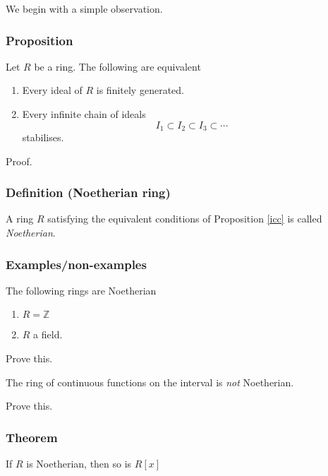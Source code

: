 \documentclass[11pt]{article}
\begin{document}
We begin with a simple observation.
\subsubsection{Proposition}
\label{sec:org4646b83}
\label{icc}
    Let \(R\) be a ring. The following are equivalent
\begin{enumerate}
\item Every ideal of \(R\) is finitely generated.
\item Every infinite chain of ideals
\[I_1 \subset I_2 \subset I_3 \subset \cdots\]
stabilises.
\end{enumerate}

\begin{skipped}
Proof.
\end{skipped}

\subsubsection{Definition (Noetherian ring)}
\label{sec:org276755d}
A ring \(R\) satisfying the equivalent conditions of Proposition \ref{icc} is called \emph{Noetherian}.

\subsubsection{Examples/non-examples}
\label{sec:org8f6bf77}
The following rings are Noetherian
\begin{enumerate}
\item \(R = {\mathbb Z}\)
\item \(R\) a field.
\end{enumerate}
\begin{skipped}
Prove this.
\end{skipped}

The ring of continuous functions on the interval is \emph{not} Noetherian.
\begin{skipped}
Prove this.
\end{skipped}

\subsubsection{Theorem}
\label{sec:orga4e8366}
If \(R\) is Noetherian, then so is \(R[x]\)
\end{document}

